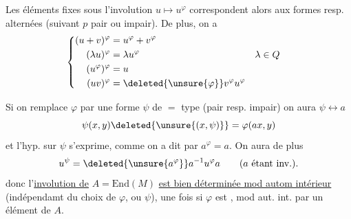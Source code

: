 Les éléments fixes sous l'involution $u\mapsto u^\varphi$ correspondent
alors aux formes  resp. alternées
(suivant $p$ pair ou impair). De plus, on a
\[
\left\{\begin{aligned}
(u+v)^\varphi&=u^\varphi+v^\varphi\\
(\lambda u)^\varphi&=\lambda u^\varphi && \lambda\in Q\\
(u^\varphi)^\varphi&=u\\
(uv)^\varphi&=\deleted{\unsure{\varphi}}v^\varphi u^\varphi
\end{aligned}\right.
\]

Si on remplace $\varphi$ par une forme $\psi$ de $=$
type (pair resp. impair) on aura $\psi\longleftrightarrow a$
\[
\psi(x,y)\deleted{\unsure{(x,\psi)}}=\varphi(ax,y)
\]
et l'hyp. sur $\psi$ s'exprime, comme on a dit
par $a^\varphi=a$. On aura de plus
\[
u^\psi=\deleted{\unsure{a^\varphi}}a^{-1}u^\varphi a\qquad\text{($a$ étant inv.).}
\]
donc l'\uline{involution de} $A=\mathrm{End}(M)$ \uline{est
bien déterminée mod autom intérieur}
(indépendamt du choix de $\varphi$, ou $\psi$), une
fois si $\varphi$ est , mod aut. int.
par un élément   de $A$.
